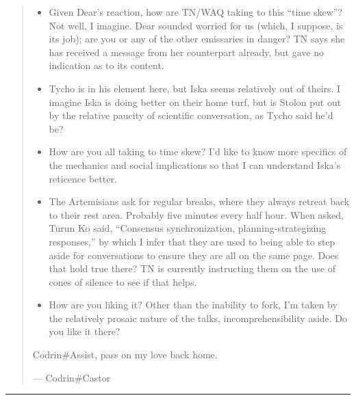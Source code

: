\begin{quote}
\begin{itemize}
\tightlist
\item
  Given Dear's reaction, how are TN/WAQ taking to this ``time skew''? Not well, I imagine. Dear sounded worried for us (which, I suppose, is its job); are you or any of the other emissaries in danger? TN says she has received a message from her counterpart already, but gave no indication as to its content.
\item
  Tycho is in his element here, but Iska seems relatively out of theirs. I imagine Iska is doing better on their home turf, but is Stolon put out by the relative paucity of scientific conversation, as Tycho said he'd be?
\item
  How are you all taking to time skew? I'd like to know more specifics of the mechanics and social implications so that I can understand Iska's reticence better.
\item
  The Artemisians ask for regular breaks, where they always retreat back to their rest area. Probably five minutes every half hour. When asked, Turun Ko said, ``Consensus synchronization, planning-strategizing responses,'' by which I infer that they are used to being able to step aside for conversations to ensure they are all on the same page. Does that hold true there? TN is currently instructing them on the use of cones of silence to see if that helps.
\item
  How are you liking it? Other than the inability to fork, I'm taken by the relatively prosaic nature of the talks, incomprehensibility aside. Do you like it there?
\end{itemize}

Codrin\#Assist, pass on my love back home.

— Codrin\#Castor
\end{quote}

\begin{center}\rule{0.5\linewidth}{0.5pt}\end{center}

